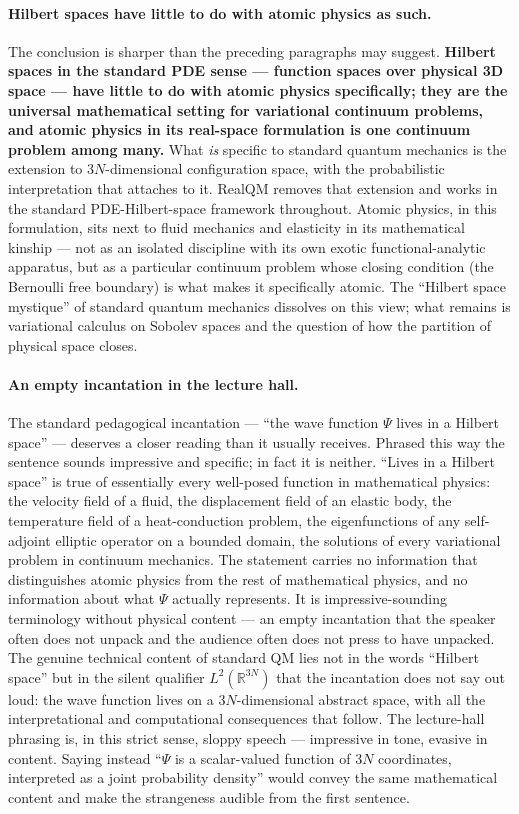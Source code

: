 \paragraph{Hilbert spaces have little to do with atomic physics as such.}
The conclusion is sharper than the preceding paragraphs may suggest. \textbf{Hilbert spaces in the standard PDE sense --- function spaces over physical 3D space --- have little to do with atomic physics specifically; they are the universal mathematical setting for variational continuum problems, and atomic physics in its real-space formulation is one continuum problem among many.} What \emph{is} specific to standard quantum mechanics is the extension to $3N$-dimensional configuration space, with the probabilistic interpretation that attaches to it. RealQM removes that extension and works in the standard PDE-Hilbert-space framework throughout. Atomic physics, in this formulation, sits next to fluid mechanics and elasticity in its mathematical kinship --- not as an isolated discipline with its own exotic functional-analytic apparatus, but as a particular continuum problem whose closing condition (the Bernoulli free boundary) is what makes it specifically atomic. The ``Hilbert space mystique'' of standard quantum mechanics dissolves on this view; what remains is variational calculus on Sobolev spaces and the question of how the partition of physical space closes.

\paragraph{An empty incantation in the lecture hall.}
The standard pedagogical incantation --- ``the wave function $\Psi$ lives in a Hilbert space'' --- deserves a closer reading than it usually receives. Phrased this way the sentence sounds impressive and specific; in fact it is neither. ``Lives in a Hilbert space'' is true of essentially every well-posed function in mathematical physics: the velocity field of a fluid, the displacement field of an elastic body, the temperature field of a heat-conduction problem, the eigenfunctions of any self-adjoint elliptic operator on a bounded domain, the solutions of every variational problem in continuum mechanics. The statement carries no information that distinguishes atomic physics from the rest of mathematical physics, and no information about what $\Psi$ actually represents. It is impressive-sounding terminology without physical content --- an empty incantation that the speaker often does not unpack and the audience often does not press to have unpacked. The genuine technical content of standard QM lies not in the words ``Hilbert space'' but in the silent qualifier $L^2(\mathbb{R}^{3N})$ that the incantation does not say out loud: the wave function lives on a $3N$-dimensional abstract space, with all the interpretational and computational consequences that follow. The lecture-hall phrasing is, in this strict sense, sloppy speech --- impressive in tone, evasive in content. Saying instead ``$\Psi$ is a scalar-valued function of $3N$ coordinates, interpreted as a joint probability density'' would convey the same mathematical content and make the strangeness audible from the first sentence.


